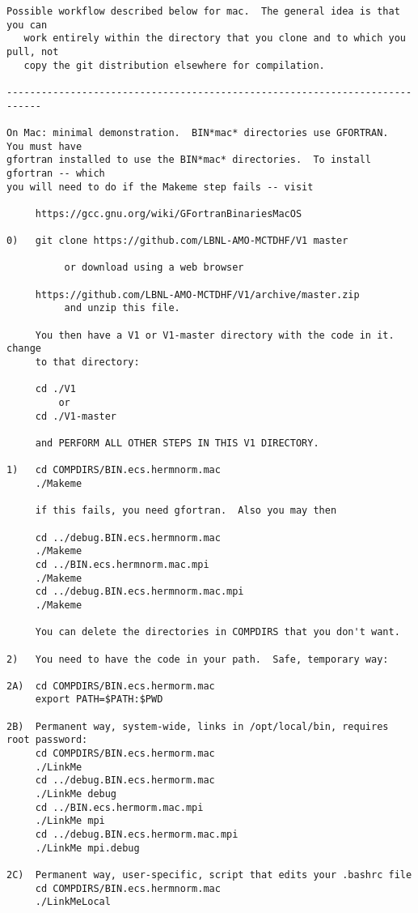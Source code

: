 \begin{verbatim}
Possible workflow described below for mac.  The general idea is that you can 
   work entirely within the directory that you clone and to which you pull, not 
   copy the git distribution elsewhere for compilation.

----------------------------------------------------------------------------

On Mac: minimal demonstration.  BIN*mac* directories use GFORTRAN.  You must have
gfortran installed to use the BIN*mac* directories.  To install gfortran -- which
you will need to do if the Makeme step fails -- visit 

     https://gcc.gnu.org/wiki/GFortranBinariesMacOS

0)   git clone https://github.com/LBNL-AMO-MCTDHF/V1 master

          or download using a web browser

     https://github.com/LBNL-AMO-MCTDHF/V1/archive/master.zip
          and unzip this file.

     You then have a V1 or V1-master directory with the code in it.  change
     to that directory:

     cd ./V1
         or
     cd ./V1-master

     and PERFORM ALL OTHER STEPS IN THIS V1 DIRECTORY.

1)   cd COMPDIRS/BIN.ecs.hermnorm.mac
     ./Makeme

     if this fails, you need gfortran.  Also you may then

     cd ../debug.BIN.ecs.hermnorm.mac
     ./Makeme
     cd ../BIN.ecs.hermnorm.mac.mpi
     ./Makeme
     cd ../debug.BIN.ecs.hermnorm.mac.mpi
     ./Makeme

     You can delete the directories in COMPDIRS that you don't want.

2)   You need to have the code in your path.  Safe, temporary way:

2A)  cd COMPDIRS/BIN.ecs.hermorm.mac
     export PATH=$PATH:$PWD

2B)  Permanent way, system-wide, links in /opt/local/bin, requires root password:
     cd COMPDIRS/BIN.ecs.hermorm.mac
     ./LinkMe
     cd ../debug.BIN.ecs.hermorm.mac
     ./LinkMe debug
     cd ../BIN.ecs.hermorm.mac.mpi
     ./LinkMe mpi
     cd ../debug.BIN.ecs.hermorm.mac.mpi
     ./LinkMe mpi.debug

2C)  Permanent way, user-specific, script that edits your .bashrc file
     cd COMPDIRS/BIN.ecs.hermnorm.mac
     ./LinkMeLocal


\end{verbatim}
